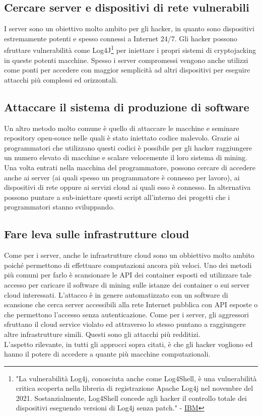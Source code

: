 \documentclass[12pt,a4paper]{article}
\begin{document}
\subsection{Cercare server e dispositivi di rete vulnerabili}
I server sono un obiettivo molto ambito per gli hacker, in quanto sono
dispositivi estremamente potenti e spesso connessi a Internet 24/7. Gli hacker
possono sfruttare vulnerabilità come Log4J\footnote{"La vulnerabilità Log4j,
conosciuta anche come Log4Shell, è una vulnerabilità critica scoperta nella
libreria di registrazione Apache Log4j nel novembre del 2021. Sostanzialmente,
Log4Shell concede agli hacker il controllo totale dei dispositivi eseguendo
versioni di Log4j senza patch." - \href{https://arc.net/l/quote/zjujxamu}{IBM}}
per iniettare i propri sistemi di cryptojacking in queste potenti macchine.
Spesso i server compromessi vengono anche utilizzi come ponti per accedere con
maggior semplicità ad altri dispositivi per eseguire attacchi più complessi ed
orizzontali.

\subsection{Attaccare il sistema di produzione di software}
Un altro metodo molto comune è quello di attaccare le macchine e seminare
repository open-souce nelle quali è stato iniettato codice malevolo. Grazie ai
programmatori che utilizzano questi codici è possibile per gli hacker
raggiungere un numero elevato di macchine e scalare velocemente il loro sistema
di mining. Una volta entrati nella macchina del programmatore, possono cercare
di accedere anche ai server (ai quali spesso un programmatore è connesso per
lavoro), ai dispositivi di rete oppure ai servizi cloud ai quali esso è
connesso. In alternativa possono puntare a sub-iniettare questi script
all'interno dei progetti che i programmatori stanno sviluppando.

\subsection{Fare leva sulle infrastrutture cloud}
Come per i server, anche le infrastrutture cloud sono un obbiettivo molto ambito
poiché permettono di effettuare computazioni ancora più veloci. Uno dei metodi
più comuni per farlo è scansionare le API dei container esposti ed utilizzare
tale accesso per caricare il software di mining sulle istanze dei
container o sui server cloud interessati. L'attacco è in genere automatizzato
con un software di scansione che cerca server accessibili alla rete Internet
pubblica con API esposte o che permettono l'accesso senza autenticazione. Come
per i server, gli aggressori sfruttano il cloud service violato ed attraverso lo
stesso puntano a raggiungere altre infrastrutture simili. Questi sono gli
attacchi più redditizi. \\
L'aspetto rilevante, in tutti gli approcci sopra citati, è che gli hacker
vogliono ed hanno il potere di accedere a quante più macchine computazionali.
\end{document}
